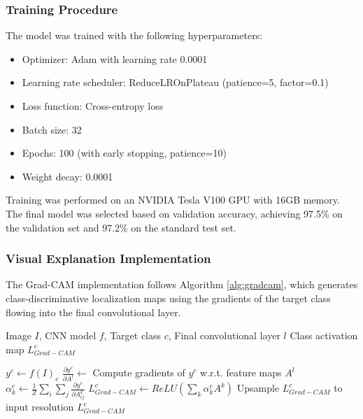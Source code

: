 \subsubsection{Training Procedure}

The model was trained with the following hyperparameters:

\begin{itemize}
    \item Optimizer: Adam with learning rate 0.0001
    \item Learning rate scheduler: ReduceLROnPlateau (patience=5, factor=0.1)
    \item Loss function: Cross-entropy loss
    \item Batch size: 32
    \item Epochs: 100 (with early stopping, patience=10)
    \item Weight decay: 0.0001
\end{itemize}

Training was performed on an NVIDIA Tesla V100 GPU with 16GB memory. The final model was selected based on validation accuracy, achieving 97.5\% on the validation set and 97.2\% on the standard test set.

\subsubsection{Visual Explanation Implementation}

The Grad-CAM implementation follows Algorithm \ref{alg:gradcam}, which generates class-discriminative localization maps using the gradients of the target class flowing into the final convolutional layer.

\begin{algorithm}
\caption{Gradient-weighted Class Activation Mapping (Grad-CAM)}
\label{alg:gradcam}
\begin{algorithmic}[1]
\REQUIRE Image $I$, CNN model $f$, Target class $c$, Final convolutional layer $l$
\ENSURE Class activation map $L_{Grad-CAM}^c$

\STATE $y^c \gets f(I)_c$ 
\STATE $\frac{\partial y^c}{\partial A^l} \gets$ Compute gradients of $y^c$ w.r.t. feature maps $A^l$
\STATE $\alpha_k^c \gets \frac{1}{Z}\sum_i\sum_j \frac{\partial y^c}{\partial A_{ij}^k}$ 
\STATE $L_{Grad-CAM}^c \gets ReLU\left(\sum_k \alpha_k^c A^k\right)$ 
\STATE Upsample $L_{Grad-CAM}^c$ to input resolution
\RETURN $L_{Grad-CAM}^c$
\end{algorithmic}
\end{algorithm}

